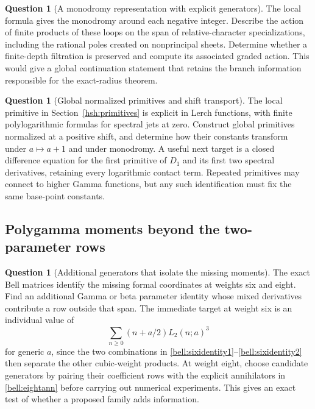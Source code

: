 \documentclass[11pt,a4paper]{article}
\numberwithin{equation}{section}
\theoremstyle{definition}
\newtheorem{question}[theorem]{Question}
\theoremstyle{remark}
\begin{document}
\begin{question}[A monodromy representation with explicit generators]
The local formula gives the monodromy around each negative integer.
Describe the action of finite products of these loops on the span
of relative-character specializations, including the rational poles
created on nonprincipal sheets. Determine whether a finite-depth
filtration is preserved and compute its associated graded action.
This would give a global continuation statement that retains the
branch information responsible for the exact-radius theorem.
\end{question}

\begin{question}[Global normalized primitives and shift transport]
The local primitive in Section~\ref{hsh:primitives} is explicit in
Lerch functions, with finite polylogarithmic formulas for spectral
jets at zero. Construct global primitives normalized at a positive
shift, and determine how their constants transform under
$a\mapsto a+1$ and under monodromy. A useful next target is a
closed difference equation for the first primitive of $D_1$ and its
first two spectral derivatives, retaining every logarithmic contact
term. Repeated primitives may connect to higher Gamma functions,
but any such identification must fix the same base-point constants.
\end{question}

\subsection{Polygamma moments beyond the two-parameter rows}

\begin{question}[Additional generators that isolate the missing moments]
The exact Bell matrices identify the missing formal coordinates at
weights six and eight. Find an additional Gamma or beta parameter
identity whose mixed derivatives contribute a row outside that span.
The immediate target at weight six is an individual value of
\[
 \sum_{n\ge0}(n+a/2)L_2(n;a)^3
\]
for generic $a$, since the two combinations in
\eqref{bell:sixidentity1}--\eqref{bell:sixidentity2} then separate
the other cubic-weight products. At weight eight, choose candidate
generators by pairing their coefficient rows with the explicit
annihilators in \eqref{bell:eightann} before carrying out numerical
experiments. This gives an exact test of whether a proposed family
adds information.
\end{question}
\end{document}
